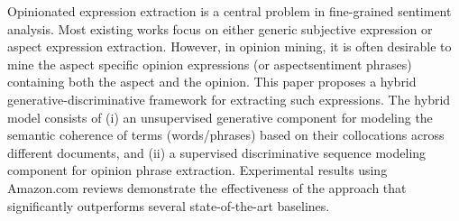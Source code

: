 Opinionated expression extraction is a central problem in fine-grained sentiment analysis. Most existing works focus on either generic subjective expression or aspect expression extraction. However, in opinion mining, it is often desirable to mine the aspect specific opinion expressions (or aspectsentiment phrases) containing both the aspect and the opinion. This paper proposes a hybrid generative-discriminative framework for extracting such expressions. The hybrid model consists of (i) an unsupervised generative component for modeling the semantic coherence of terms (words/phrases) based on their collocations across different documents, and (ii) a supervised discriminative sequence modeling component for opinion phrase extraction. Experimental results using Amazon.com reviews demonstrate the effectiveness of the approach that significantly outperforms several state-of-the-art baselines.
